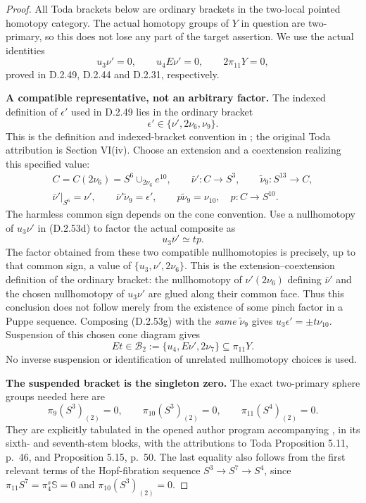 \begin{proof}
All Toda brackets below are ordinary brackets in the
two-local pointed homotopy category.  The actual homotopy
groups of $Y$ in question are two-primary, so this does
not lose any part of the target assertion.
We use the actual identities
\[
             u_3\nu'=0,\qquad u_4E\nu'=0,
                         \qquad 2\pi_{11}Y=0,
             \tag{D.2.53d}
\]
proved in D.2.49, D.2.44 and D.2.31, respectively.

\textbf{A compatible representative, not an arbitrary factor.}
The indexed definition of $\epsilon'$ used in D.2.49 lies
in the ordinary bracket
\[
                    \epsilon'\in\{\nu',2\nu_6,\nu_9\}.
                    \tag{D.2.53e}
\]
This is the definition and indexed-bracket convention in
\cite[Section 2.5, p.~4, and the accompanying author program]
{FGHStricklandToda}; the original Toda attribution is
Section VI(iv).  Choose an extension and a coextension
realizing this specified value:
\[
 \begin{gathered}
 C=C(2\nu_6)=S^6\cup_{2\nu_6}e^{10},\qquad
 \bar\nu':C\longrightarrow S^3,\qquad
 \widetilde\nu_9:S^{13}\longrightarrow C,\\
 \bar\nu'|_{S^6}=\nu',\qquad
 \bar\nu'\widetilde\nu_9=\epsilon',\qquad
 p\widetilde\nu_9=\nu_{10},
 \quad p:C\longrightarrow S^{10}.
 \end{gathered}
 \tag{D.2.53f}
\]
The harmless common sign depends on the cone convention.
Use a nullhomotopy of $u_3\nu'$ in
\textup{(D.2.53d)} to factor the actual composite as
\[
                         u_3\bar\nu'\simeq t p.
                         \tag{D.2.53g}
\]
The factor obtained from these two compatible
nullhomotopies is precisely, up to that common sign,
a value of $\{u_3,\nu',2\nu_6\}$.  This is the
extension--coextension definition of the ordinary bracket:
the nullhomotopy of $\nu'(2\nu_6)$ defining $\bar\nu'$
and the chosen nullhomotopy of $u_3\nu'$ are glued along
their common face.  Thus this conclusion does not follow
merely from the existence of some pinch factor in a
Puppe sequence.  Composing \textup{(D.2.53g)} with the
\emph{same} $\widetilde\nu_9$ gives
$u_3\epsilon'=\pm t\nu_{10}$.
Suspension of this chosen cone diagram gives
\[
                    Et\in\mathcal B_2
                         :=\{u_4,E\nu',2\nu_7\}
                              \subseteq\pi_{11}Y.
                    \tag{D.2.53h}
\]
No inverse suspension or identification of unrelated
nullhomotopy choices is used.

\textbf{The suspended bracket is the singleton zero.}
The exact two-primary sphere groups needed here are
\[
                 \pi_9(S^3)_{(2)}=0,\qquad
                 \pi_{10}(S^3)_{(2)}=0,\qquad
                 \pi_{11}(S^4)_{(2)}=0.
                 \tag{D.2.53i}
\]
They are explicitly tabulated in the opened author
program accompanying \cite{FGHStricklandToda}, in its
sixth- and seventh-stem blocks, with the attributions
to Toda Proposition 5.11, p.~46, and Proposition 5.15,
p.~50.  The last equality also follows from the first
relevant terms of the Hopf-fibration sequence
$S^3\to S^7\to S^4$, since
$\pi_{11}S^7=\pi_4^s\mathbb S=0$ and
$\pi_{10}(S^3)_{(2)}=0$.


\end{proof}
